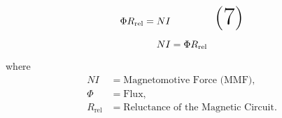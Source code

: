 \documentclass{article}
\begin{document}
\vspace{0.5cm} %
\begin{equation}
   \Huge  {\Phi}R_\text{rel}= NI \tag{7}
\end{equation}\vspace{0.5cm} %

\begin{tcolorbox}[colframe=red, boxrule=1mm, sharp corners=south] %
\[
   \Huge NI= {\Phi}R_\text{rel}\\
\]
\end{tcolorbox}

\noindent
where 
\begin{align*}
NI &= \text{Magnetomotive Force (MMF)}, \\
\Phi &= \text{Flux}, \\
R_\text{rel} &= \text{Reluctance of the Magnetic Circuit}.
\end{align*}
\end{document}
